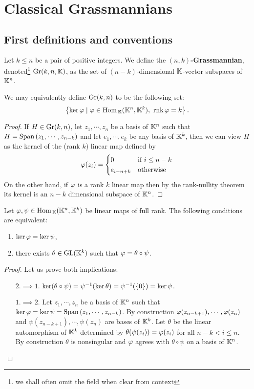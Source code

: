 \chapter{Classical Grassmannians}

\section{First definitions and conventions}
\begin{definition}[Grassmannian]
Let $k\leq n$ be a pair of positive integers. We define the \textbf{$(n,k)$-Grassmannian}, denoted\footnote{we shall often omit the field when clear from context} $\mathrm{Gr}(k,n,\mathbb{K})$, as the set of $(n-k)$-dimensional $\mathbb{K}$-vector subspaces of $\mathbb{K}^n$.
\end{definition}

\begin{remark}
We may equivalently define $\mathrm{Gr}(k,n)$ to be the following set:
\[\cpa{\ker \vp\mid \vp\in \Hom_\K(\K^n,\K^k),\ \rnk \vp=k}.\]
\end{remark}
\begin{proof}
If $H\in \mathrm{Gr}(k,n)$, let $z_1,\cdots, z_n$ be a basis of $\mathbb{K}^n$ such that $H=\mathrm{Span}\,(z_1,\cdots, z_{n-k})$ and let $e_1,\cdots, e_k$ be any basis of $\mathbb{K}^k$, then we can view $H$ as the kernel of the (rank $k$) linear map defined by
\[\varphi(z_i)=\begin{cases}
0 &\text{if }i\leq n-k\\
e_{i-n+k} &\text{otherwise}
\end{cases}\]
On the other hand, if $\varphi$ is a rank $k$ linear map then by the rank-nullity theorem its kernel is an $n-k$ dimensional subspace of $\mathbb{K}^n$.
\end{proof}

\begin{lemma}\label{kerAkerBVSActionOfGLk}
Let $\varphi,\psi\in \mathrm{Hom}\,_{\mathbb{K}}(\mathbb{K}^n,\mathbb{K}^k)$ be linear maps of full rank. The following conditions are equivalent:
\begin{enumerate}
    \item $\ker\varphi=\ker\psi$,
    \item there exists $\theta\in \mathrm{GL}(\mathbb{K}^k)$ such that $\varphi=\theta\circ \psi$. 
\end{enumerate}
\end{lemma}
\begin{proof}
Let us prove both implications:
\setlength{\leftmargini}{0cm}
\begin{itemize}
\item[$\boxed{2.\implies 1.}$] $\ker(\theta\circ \psi)=\psi^{-1}(\ker \theta)=\psi^{-1}(\left\{{0}\right\})=\ker \psi$. 
\item[$\boxed{1.\implies 2.}$] Let $z_1,\cdots, z_n$ be a basis of $\mathbb{K}^n$ such that $\ker\varphi=\ker\psi=\mathrm{Span}\,(z_1,\cdots, z_{n-k})$. By construction $\varphi(z_{n-k+1}),\cdots, \varphi(z_n)$ and $\psi(z_{n-k+1}),\cdots, \psi(z_n)$ are bases of $\mathbb{K}^k$. Let $\theta$ be the linear automorphism of $\mathbb{K}^k$ determined by $\theta(\psi(z_i))=\varphi(z_i)$ for all $n-k<i\leq n$. By construction $\theta$ is nonsingular and $\varphi$ agrees with $\theta\circ \psi$ on a basis of $\mathbb{K}^n$.
\end{itemize}
\setlength{\leftmargini}{0.5cm}
\end{proof}

